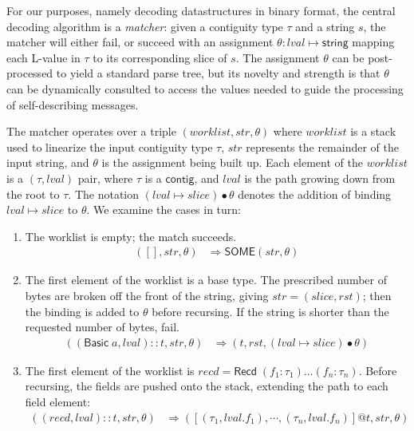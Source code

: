 \documentclass[a4paper,UKenglish,cleveref, autoref, thm-restate]{lipics-v2021}
\newcommand{\konst}[1]{\ensuremath{\mathsf{#1}}}
\newcommand{\lval}{\ensuremath{\mathit{lval}}}
\begin{document}
For our purposes, namely decoding datastructures in binary format, the
central decoding algorithm is a \emph{matcher}: given a contiguity
type $\tau$ and a string $s$, the matcher will either fail, or succeed
with an assignment $\theta : \mathit{lval} \mapsto \konst{string}$
mapping each L-value in $\tau$ to its corresponding slice of $s$. The
assignment $\theta$ can be post-processed to yield a standard parse
tree, but its novelty and strength is that $\theta$ can be dynamically
consulted to access the values needed to guide the processing of
self-describing messages.

\begin{definition}

The matcher operates over a triple
$(\mathit{worklist},\mathit{str}, \theta)$ where $\mathit{worklist}$ is a stack used to
linearize the input contiguity type $\tau$, $\mathit{str}$ represents
the remainder of the input string, and $\theta$ is the assignment
being built up. Each element of the $\mathit{worklist}$ is a
$(\tau,\mathit{lval})$ pair, where $\tau$ is a \konst{contig}, and
$\mathit{lval}$ is the path growing down from the root to $\tau$. The
notation $(\lval \mapsto \mathit{slice}) \bullet \theta$ denotes the
addition of binding $\lval \mapsto \mathit{slice}$ to $\theta$.
We examine the cases in turn:

\begin{enumerate}

\item The worklist is empty; the match succeeds.
%
\begin{align*}
([], \mathit{str}, \theta) &\Rightarrow \konst{SOME}(\mathit{str}, \theta)
\end{align*}

\item The first element of the worklist is a base type. The
  prescribed number of bytes are broken off the front of the string, giving
  $\mathit{str} = (\mathit{slice},\mathit{rst})$; then the
  binding is added to $\theta$ before recursing. If the string is shorter
  than the requested number of bytes, fail.
%
\begin{align*}
((\konst{Basic}\;a, \lval)::t, \mathit{str}, \theta)
   &\Rightarrow
  (t,\mathit{rst}, (\lval \mapsto \mathit{slice}) \bullet \theta)
\end{align*}

\item The first element of the worklist is $\mathit{recd} =
  \konst{Recd}\;(f_1 : \tau_1) \ldots (f_n : \tau_n)$. Before
  recursing, the fields are pushed onto the stack, extending the path
  to each field element:
%
\begin{align*}
((\mathit{recd}, \lval)::t, \mathit{str}, \theta)
   &\Rightarrow
  ([(\tau_1,\lval.f_1), \cdots , (\tau_n,\lval.f_n)] @ t,\mathit{str}, \theta)
\end{align*}


\end{enumerate}
\end{definition}
\end{document}
